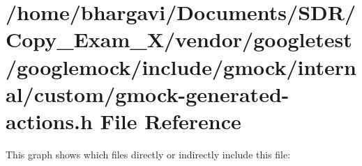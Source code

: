 \hypertarget{internal_2custom_2gmock-generated-actions_8h}{}\section{/home/bhargavi/\+Documents/\+S\+D\+R/\+Copy\+\_\+\+Exam\+\_\+X/vendor/googletest/googlemock/include/gmock/internal/custom/gmock-\/generated-\/actions.h File Reference}
\label{internal_2custom_2gmock-generated-actions_8h}
This graph shows which files directly or indirectly include this file\+:
